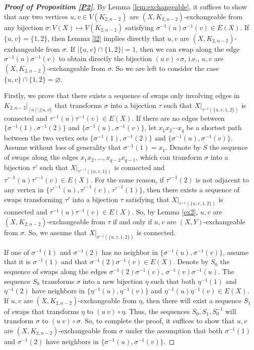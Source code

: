 \documentclass[11pt]{article}
\newcommand{\FS}{\mathsf{FS}}
\begin{document}


\begin{proof}[\bfseries{Proof of Proposition \ref{P2}}]
 By Lemma \ref{lem:exchangeable}, it suffices to show that any two vertices $u, v\in V(K_{2,n-2})$ are $(X, K_{2,n-2})$-exchangeable from any bijection $\sigma:V(X)\mapsto V(K_{2,n-2})$ satisfying $\sigma^{-1}(u)\sigma^{-1}(v)\in E(X)$. If $\{u,v\}=\{1,2\}$, then Lemma \ref{l2} implies directly that $u, v$ are $(X, K_{2,n-2})$-exchangeable from $\sigma$. If $|\{u,v\}\cap\{1,2\}|=1$, then we can swap along the edge $\sigma^{-1}(u)\sigma^{-1}(v)$ to obtain directly the bijection $(u \ v)\circ \sigma$, i.e., $u, v$ are $(X, K_{2,n-2})$-exchangeable from $\sigma$. So we are left to consider  the case $\{u,v\}\cap \{1,2\}=\varnothing$.  
 
 Firstly, we prove that there exists a sequence of swaps only involving edges in $K_{2,n-2}|_{[n]\setminus \{u,v\}}$ that transforms $\sigma$ into a bijection $\tau$ such that  $X|_{\tau^{-1}(\{u,v,1,2\})}$ is connected and $\tau^{-1}(u)\tau^{-1}(v)\in E(X)$. If there are no edges between $\{\sigma^{-1}(1), \sigma^{-1}(2)\}$ and $\{\sigma^{-1}(u), \sigma^{-1}(v)\}$, let $x_1x_2\cdots x_q$ be a shortest path between the two vertex sets $\{\sigma^{-1}(1),\sigma^{-1}(2)\}$ and $\{\sigma^{-1}(u),\sigma^{-1}(v)\}$. Assume without loss of generality that $\sigma^{-1}(1)=x_1$. Denote by $S$ the sequence of swaps along the edges $x_1x_2,\dots, x_{q-2}x_{q-1}$, which can transform $\sigma$ into a bijection $\tau'$ such that $X|_{\tau'^{-1}(\{u,v,1\})}$ is connected and $\tau'^{-1}(u)\tau'^{-1}(v)\in E(X)$. For the same reason, if $\tau'^{-1}(2)$ is not adjacent to any vertex in $\{ \tau'^{-1}(u),\tau'^{-1}(v)$, $\tau'^{-1}(1)\}$, then there exists a sequence of swaps  transforming $\tau'$ into a bijection $\tau$ satisfying that $X|_{\tau^{-1}(\{u,v,1,2\})}$ is connected and $\tau^{-1}(u)\tau^{-1}(v)\in E(X)$.
 So, by Lemma \ref{ex2}, $u,v$ are $(X,K_{2,n-2})$-exchangeable from $\tau$ if and only if $u,v$ are  $(X,Y)$-exchangeable from $\sigma$.  So, we assume that $X|_{\sigma^{-1}(\{u,v,1,2\})}$ is connected. 

If one of $\sigma^{-1}(1)$ and $\sigma^{-1}(2)$ has no neighbor in $\{\sigma^{-1}(u),\sigma^{-1}(v)\}$, assume that it is $\sigma^{-1}(1)$ and  that $\sigma^{-1}(2)\sigma^{-1}(v)\in E(X)$. Denote by $S_0$ the sequence of swaps along the edges $\sigma^{-1}(2)\sigma^{-1}(v)$, $\sigma^{-1}(v)\sigma^{-1}(u)$. The sequence  $S_0$ transforms $\sigma$ into a new bijection $\eta$ such that both $\eta^{-1}(1)$ and $\eta^{-1}(2)$ have neighbors in $\{\eta^{-1}(u),\eta^{-1}(v)\}$ and $\eta^{-1}(u)\eta^{-1}(v)\in E(X)$. If $u,v$ are $(X,K_{2,n-2})$-exchangeable from $\eta$, then there will exist a sequence $S_1$ of swaps  that transforms $\eta$ to $(u \ v)\circ \eta$. Thus, the sequences $S_0,S_1,S^{-1}_0$ will transform $\sigma$ to $(u \ v)\circ \sigma$.  So, to complete the proof, it suffices to show that $u,v$ are $(X,K_{2,n-2})$-exchangeable from $\sigma$ under the assumption that both $\sigma^{-1}(1)$ and $\sigma^{-1}(2)$ have neighbors in $\{\sigma^{-1}(u),\sigma^{-1}(v)\}$. 


\end{proof}
\end{document}
